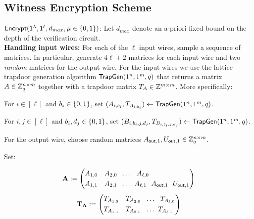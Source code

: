 
\newpage


\subsection{Witness Encryption Scheme}

\BI
\item ${\mathsf{Encrypt}}(1^\lambda,1^\ell,d_{max},\mu\in\{0,1\})$: Let $d_{max}$ denote an a-priori fixed bound on the depth of the verification circuit. \\
{\bf Handling input wires:}
For each of the $\ell$ input wires, sample a sequence of matrices. In particular, generate $4\ell+2$ matrices for each input wire and two \emph{random} matrices for the output wire. For the
input wires we use the lattice-trapdoor generation algorithm ${\mathsf{TrapGen}}(1^n,1^m,q)$ that returns a matrix
$A \in \mathbb{Z}_q^{n\times m}$ together with a trapdoor matrix $T_A\in \mathbb{Z}^{m\times m}$. More specifically: 

\BI
\item For $i \in [\ell]$ and $b_i\in\{0,1\}$, set $(A_{i,b_i}, T_{A_{i,b_i}})\leftarrow {\mathsf{TrapGen}}(1^n,1^m,q)$.
\item For $i,j \in [\ell]$ and $b_i,d_j\in\{0,1\}$, set $(B_{i,b_i,j,d_j}, T_{B_{i,b_i,j,d_j}})\leftarrow {\mathsf{TrapGen}}(1^n,1^m,q)$.
\item For the output wire, choose random matrices $A_{\mathsf{out},1},U_{\mathsf{out},1}  \in \mathbb{Z}_q^{n\times m}$.
\item[] Set:
\begin{multicols}{2}
\begin{equation*}
    {\bf A}:=\left(  
         \begin{split} A_{1,0}~&~~A_{2,0}~~\ldots~~A_{\ell,0} \\
        A_{1,1}~&~~A_{2,1}~~\ldots~A_{\ell,1}~~ A_{\mathsf{out},1}~~   U_{\mathsf{out},1}
               \end{split}
    \right)
    \end{equation*}\break    
    \begin{equation*}
      {\bf T_A}:=\left(  
         \begin{split} T_{A_{1,0}}~&~~T_{A_{2,0}}~~\ldots~~T_{A_{\ell,0}} \\
        T_{A_{1,1}}~&~~T_{A_{2,1}}~~\ldots~T_{A_{\ell,1}}~    
               \end{split}
    \right)
    \end{equation*}
\end{multicols}


